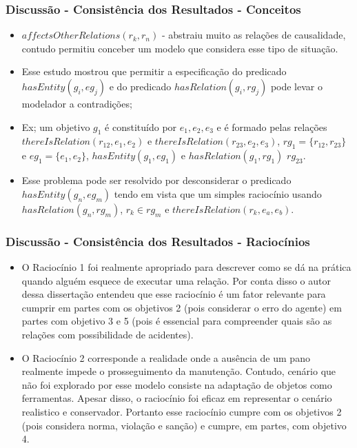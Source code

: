 \documentclass{beamer}
\begin{document}
\begin{frame}
	\frametitle{Discussão - Consistência dos Resultados - Conceitos}
	\begin{itemize}
		\item $affectsOtherRelations(r_k,r_n)$ - abstraiu muito as relações de causalidade, contudo permitiu conceber um modelo que considera esse tipo de situação.
		\item Esse estudo mostrou que permitir a especificação do predicado $hasEntity(g_i,eg_j)$ e do predicado $hasRelation(g_i,rg_j)$ pode levar o modelador a contradições;
		\item Ex; um objetivo $g_1$ é constituído por $e_1,e_2,e_3$ e é formado pelas relações $thereIsRelation(r_{12},e_1,e_2)$ e $thereIsRelation(r_{23},e_2,e_3)$, $rg_1 = \{ r_{12},r_{23} \}$ e $ eg_1 = \{ e_1, e_2 \} $, $ hasEntity(g_1,eg_1) $ e $ hasRelation(g_1, rg_1) $ $rg_{23}$. 
		\item Esse problema pode ser resolvido por desconsiderar o predicado $hasEntity(g_n,eg_m)$ tendo em vista que um simples raciocínio usando $hasRelation(g_n,rg_m)$, $r_k \in rg_m$ e $thereIsRelation(r_k, e_a,e_b)$.
	\end{itemize}
\end{frame}

\begin{frame}
	\frametitle{Discussão - Consistência dos Resultados - Raciocínios}
	\begin{itemize}
		\item O Raciocínio 1 foi realmente apropriado para descrever como se dá na prática quando alguém esquece de executar uma relação. Por conta disso o autor dessa dissertação entendeu que esse raciocínio é um fator relevante para cumprir em partes com os objetivos 2 (pois considerar o erro do agente) em partes com objetivo  3 e 5 (pois é essencial para compreender quais são as relações com possibilidade de acidentes). 
		\item O Raciocínio 2 corresponde a realidade onde a ausência de um pano realmente impede o prosseguimento da manutenção. Contudo, cenário que não foi explorado por esse modelo consiste na adaptação de objetos como ferramentas. Apesar disso, o raciocínio foi eficaz em representar o cenário realistico e conservador. Portanto esse raciocínio cumpre com os objetivos 2 (pois considera norma, violação e sanção) e cumpre, em partes, com objetivo 4.
	\end{itemize}
\end{frame}
\end{document}
